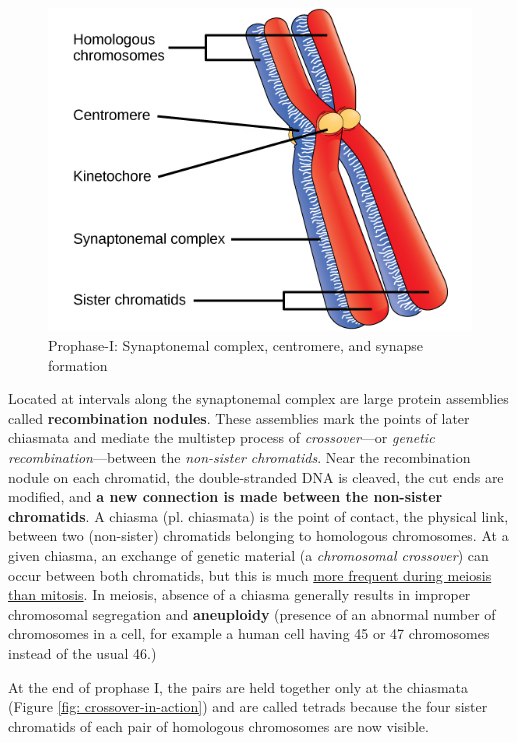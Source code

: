 \begin{enumerate}
\begin{figure}[h!]
    \includegraphics[scale=0.4]{synapse-formation.jpeg}
    \caption{Prophase-I: Synaptonemal complex, centromere, and synapse formation}
    \label{fig: synapse-formation}
\end{figure}
        Located at intervals along the synaptonemal complex are large protein assemblies called \textbf{recombination nodules}. These assemblies mark the points of later chiasmata and mediate the multistep process of \emph{crossover}—or \emph{genetic recombination}—between the \emph{non-sister chromatids}. Near the recombination nodule on each chromatid, the double-stranded DNA is cleaved, the cut ends are modified, and \textbf{a new connection is made between the non-sister chromatids}. A chiasma (pl. chiasmata) is the point of contact, the physical link, between two (non-sister) chromatids belonging to homologous chromosomes. At a given chiasma, an exchange of genetic material (a \emph{chromosomal crossover}) can occur between both chromatids, but this is much \href{https://en.wikipedia.org/wiki/Chiasma_(genetics)}{more frequent during meiosis than mitosis}. In meiosis, absence of a chiasma generally results in improper chromosomal segregation and \textbf{aneuploidy} (presence of an abnormal number of chromosomes in a cell, for example a human cell having 45 or 47 chromosomes instead of the usual 46.)

        At the end of prophase I, the pairs are held together only at the chiasmata (Figure \ref{fig: crossover-in-action}) and are called tetrads because the four sister chromatids of each pair of homologous chromosomes are now visible.


\end{enumerate}
